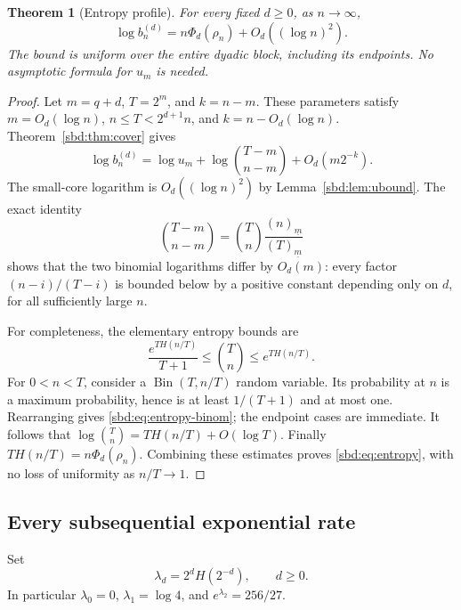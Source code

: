 \documentclass[11pt,a4paper]{article}
\newtheorem{theorem}{Theorem}[section]
\theoremstyle{definition}
\newcommand{\fall}[2]{(#1)_{\underline{#2}}}
\DeclareMathOperator{\Bin}{Bin}
\begin{document}
\begin{theorem}[Entropy profile]\label{sbd:thm:entropy}
For every fixed $d\ge0$, as $n\to\infty$,
\begin{equation}\label{sbd:eq:entropy}
 \boxed{\quad \log b_n^{(d)}
       =n\Phi_d(\rho_n)+O_d((\log n)^2).\quad}
\end{equation}
The bound is uniform over the entire dyadic block, including its
endpoints. No asymptotic formula for $u_m$ is needed.
\end{theorem}
\begin{proof}
Let $m=q+d$, $T=2^m$, and $k=n-m$. These parameters satisfy
$m=O_d(\log n)$, $n\le T<2^{d+1}n$, and $k=n-O_d(\log n)$.
Theorem~\ref{sbd:thm:cover} gives
\begin{equation}\label{sbd:eq:loglead}
 \log b_n^{(d)}=\log u_m+\log\binom{T-m}{n-m}
                  +O_d(m2^{-k}).
\end{equation}
The small-core logarithm is $O_d((\log n)^2)$ by
Lemma~\ref{sbd:lem:ubound}. The exact identity
\begin{equation}\label{sbd:eq:binratio}
 \binom{T-m}{n-m}=\binom Tn\frac{\fall nm}{\fall Tm}
\end{equation}
shows that the two binomial logarithms differ by $O_d(m)$:
every factor $(n-i)/(T-i)$ is bounded below by a positive constant
depending only on $d$, for all sufficiently large $n$.

For completeness, the elementary entropy bounds are
\begin{equation}\label{sbd:eq:entropy-binom}
 \frac{e^{T H(n/T)}}{T+1}\le\binom Tn\le e^{T H(n/T)}.
\end{equation}
For $0<n<T$, consider a $\Bin(T,n/T)$ random variable. Its probability
at $n$ is a maximum probability, hence is at least $1/(T+1)$ and at most
one. Rearranging gives \eqref{sbd:eq:entropy-binom}; the endpoint cases are
immediate. It follows that $\log\binom Tn=T H(n/T)+O(\log T)$.
Finally $T H(n/T)=n\Phi_d(\rho_n)$. Combining these estimates proves
\eqref{sbd:eq:entropy}, with no loss of uniformity as $n/T\to1$.
\end{proof}

\subsection{Every subsequential exponential rate}
Set
\begin{equation}\label{sbd:eq:lambdadef}
 \lambda_d=2^d H(2^{-d}),\qquad d\ge0.
\end{equation}
In particular $\lambda_0=0$, $\lambda_1=\log4$, and
$e^{\lambda_2}=256/27$.
\end{document}

